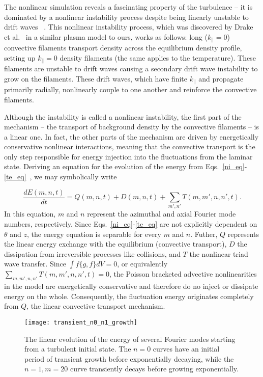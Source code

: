 \documentclass[showpacs,preprintnumbers,amsmath,amssymb,superscriptaddress,aip]{revtex4-1}
\def\beq{\begin{equation}}
\def\eeq{\end{equation}}
\def\para{\parallel}
\newcommand{\diff}[2]{\frac{d#1}{d#2}}
\begin{document}
The nonlinear simulation reveals a fascinating property of the turbulence -- it is dominated by a nonlinear instability process despite being linearly unstable to drift waves
~\cite{friedman2012b,friedman2013}.
This nonlinear instability process, which was discovered by Drake et al.~\cite{drake1995} in a similar plasma model to ours, works as follows: 
long ($k_\para=0$) convective filaments transport density across the equilibrium density profile, setting up $k_\para=0$ density filaments (the same applies to the temperature). 
These filaments are unstable to drift waves causing a secondary drift wave instability to grow on the filaments. 
These drift waves, which have finite $k_\para$ and propagate primarily radially, nonlinearly couple to one another and reinforce the convective filaments.

Although the instability is called a nonlinear instability, the first part of the mechanism -- the transport of background density by the convective filaments -- is a linear one.
In fact, the other parts of the mechanism are driven by energetically conservative nonlinear interactions, 
meaning that the convective transport is the only step responsible for energy injection into the fluctuations from the laminar state.
Deriving an equation for the evolution of the energy from Eqs.~\ref{ni_eq}-\ref{te_eq}~\cite{friedman2012b,friedman2013}, we may symbolically write

\beq
\label{dEdt_def}
\diff{E(m,n,t)}{t} = Q(m,n,t) + D(m,n,t) + \sum_{m',n'} T(m,m',n,n',t).
\eeq
In this equation, $m$ and $n$ represent the azimuthal and axial Fourier mode numbers, respectively. 
Since Eqs.~\ref{ni_eq}-\ref{te_eq} are not explicitly dependent on $\theta$ and $z$, the energy equation is separable for every $m$ and $n$. 
Futher, $Q$ represents the linear energy exchange with the equilibrium (convective transport), $D$ the dissipation from irreversible processes
like collisions, and $T$ the nonlinear triad wave transfer. Since $\int f \{g,f\} dV = 0$, or equivalently $\sum_{m,m',n,n'} T(m,m',n,n',t)=0$, 
the Poisson bracketed advective nonlinearities in the model are energetically conservative and therefore do no inject or dissipate energy on the whole.
Consequently, the fluctuation energy originates completely from $Q$, the linear convective transport mechanism.

\begin{figure}
\centerline{\texttt{[image: transient\_n0\_n1\_growth]}}
\caption{The linear evolution of the energy of several Fourier modes starting from a turbulent initial state. The $n=0$ curves have an initial period of transient growth before exponentially decaying,
while the $n=1,m=20$ curve transiently decays before growing exponentially.}
\label{transient_n0_n1_growth}
\end{figure}
\end{document}
